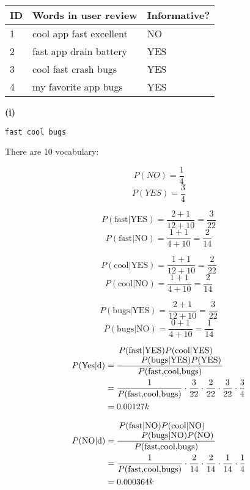 \documentclass[11pt,a4paper]{report}
\begin{document}
\begin{multicols*}{2}
\begin{center}
\begin{tabular}{ | l | l |l|}
    \hline
    ID & Words in user review & Informative? \\
    \hline
    1  & cool app fast excellent & NO \\
    2  & fast app drain battery & YES \\
    3  & cool fast crash bugs & YES \\
    4  & my favorite app bugs & YES \\
    \hline
\end{tabular}
\end{center}

\noindent \textbf{(i)}

\begin{center}\verb|fast cool bugs|\end{center}

\noindent There are 10 vocabulary:

$$P(NO) = \frac{1}{4}$$
$$P(YES) = \frac{3}{4}$$

$$P(\text{fast}|\text{YES}) = \frac{2 + 1}{12 + 10} = \frac{3}{22}$$
$$P(\text{fast}|\text{NO}) = \frac{1 + 1}{4 + 10} = \frac{2}{14}$$

$$P(\text{cool}|\text{YES}) = \frac{1 + 1}{12 + 10} = \frac{2}{22}$$
$$P(\text{cool}|\text{NO}) = \frac{1 + 1}{4 + 10} = \frac{2}{14}$$

$$P(\text{bugs}|\text{YES}) = \frac{2 + 1}{12 + 10} = \frac{3}{22}$$
$$P(\text{bugs}|\text{NO}) = \frac{0 + 1}{4 + 10} = \frac{1}{14}$$

\begin{equation*}
\begin{split}
P(\text{Yes}|\text{d}) &= \frac{\splitfrac{P(\text{fast}|\text{YES})P(\text{cool}|\text{YES})}{P(\text{bugs}|\text{YES})P(\text{YES})}}{P(\text{fast,cool,bugs})}\\
&= \frac{1}{P(\text{fast,cool,bugs})} \cdot \frac{3}{22} \cdot \frac{2}{22} \cdot \frac{3}{22} \cdot \frac{3}{4}\\
&= 0.00127k
\end{split}
\end{equation*}

\begin{equation*}
\begin{split}
P(\text{NO}|\text{d}) &= \frac{\splitfrac{P(\text{fast}|\text{NO})P(\text{cool}|\text{NO})}{P(\text{bugs}|\text{NO})P(\text{NO})}}{P(\text{fast,cool,bugs})}\\
&= \frac{1}{P(\text{fast,cool,bugs})} \cdot \frac{2}{14} \cdot \frac{2}{14} \cdot \frac{1}{14} \cdot \frac{1}{4}\\
&= 0.000364k
\end{split}
\end{equation*}


\end{multicols*}
\end{document}
